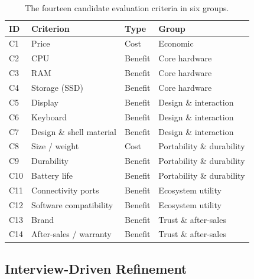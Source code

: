 \begin{table}[htbp]
  \centering
  \caption{The fourteen candidate evaluation criteria in six groups.}
  \label{tab:criteria}
  \begin{tabularx}{\textwidth}{@{}L{1.2cm}L{4.6cm}L{2.2cm}Y@{}}
    \toprule
    \textbf{ID} & \textbf{Criterion} & \textbf{Type} & \textbf{Group} \\
    \midrule
    C1  & Price                   & Cost    & Economic \\
    C2  & CPU                     & Benefit & Core hardware \\
    C3  & RAM                     & Benefit & Core hardware \\
    C4  & Storage (SSD)           & Benefit & Core hardware \\
    C5  & Display                 & Benefit & Design \& interaction \\
    C6  & Keyboard                & Benefit & Design \& interaction \\
    C7  & Design \& shell material & Benefit & Design \& interaction \\
    C8  & Size / weight           & Cost    & Portability \& durability \\
    C9  & Durability              & Benefit & Portability \& durability \\
    C10 & Battery life            & Benefit & Portability \& durability \\
    C11 & Connectivity ports      & Benefit & Ecosystem utility \\
    C12 & Software compatibility  & Benefit & Ecosystem utility \\
    C13 & Brand                   & Benefit & Trust \& after-sales \\
    C14 & After-sales / warranty  & Benefit & Trust \& after-sales \\
    \bottomrule
  \end{tabularx}
\end{table}

\subsection{Interview-Driven Refinement}\label{subsec:interview-outcomes}


